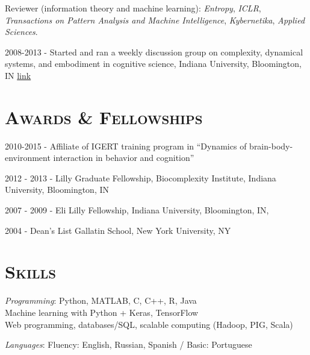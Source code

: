 \documentclass[margin,line,centered]{res}
\begin{document}
\begin{resume}
Reviewer (information theory and machine learning): \emph{Entropy}, \emph{ICLR}, \emph{Transactions on Pattern Analysis and Machine Intelligence}, \emph{Kybernetika}, \emph{Applied Sciences}.

2008-2013 - Started and ran a weekly discussion group on complexity, dynamical systems, and embodiment in cognitive science, Indiana University, Bloomington, IN \href{http://apophenia.wikidot.com/}{link}

\section{\textsc{Awards \& Fellowships}}
2010-2015 - Affiliate of IGERT training program in ``Dynamics of brain-body-environment interaction in behavior and cognition'' 

2012 - 2013 - Lilly Graduate Fellowship, Biocomplexity Institute, Indiana University, Bloomington, IN

2007 - 2009 - Eli Lilly Fellowship, Indiana University, Bloomington, IN, 

2004 - Dean's List Gallatin School, New York University, NY


\section{\textsc{Skills}}



\hangindent=10pt \emph{Programming}: Python, MATLAB, C, C++, R, Java \\
Machine learning with Python + Keras, TensorFlow\\
Web programming, databases/SQL, scalable computing (Hadoop, PIG, Scala)

\emph{Languages}: Fluency: English, Russian, Spanish / Basic: Portuguese

\end{resume}
\end{document}
